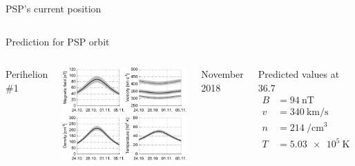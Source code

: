 \begin{frame}[plain,c]{PSP's current position}{}
\begin{columns}[t]
	\end{columns}
\end{frame}
\begin{frame}[plain,c]{Prediction for PSP orbit}{}
	\begin{columns}[c]
		
		\centering
		Perihelion \#1\\\ 
		
		\includegraphics[width=\textwidth]{../figures_paper/SPP_perihelia_prediction_f_plot.pdf}
		
		November 2018

		
		\begin{block}{\centering Predicted values at 36.7~\Rs}
			\begin{align*}
				B &= \SI{94}{\nano\tesla}\\
				v &= \SI{340}{\km\per\s}\\
				n &= \SI{214}{\per\cm\cubed}\\
				T &= \SI{5.03e5}{\kelvin}
			\end{align*}
		\end{block}
	
	\end{columns}
\end{frame}
